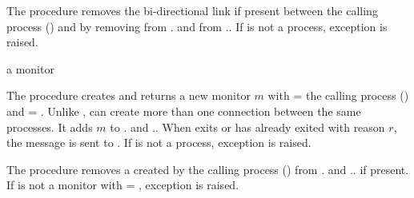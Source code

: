 \begin{procedure}
\end{procedure}
\returns{} 

The  procedure removes the bi-directional link if
present between the calling process () and  by
removing  from . and
 from ..  If  is not
a process, exception  is
raised.

\begin{procedure}
\end{procedure}
\returns{} a monitor

The  procedure creates and returns a new monitor $m$
with  = the calling process () and
 = .  Unlike ,
 can create more than one connection between the same
processes.  It adds $m$ to . and
..  When  exits or has
already exited with reason $r$, the message  is sent to .  If  is not
a process, exception  is
raised.

\begin{procedure}
\end{procedure}
\returns{} 

The  procedure removes a  created by
the calling process () from . and
.. if present.  If
 is not a monitor with  = ,
exception  is raised.

\begin{procedure}
\end{procedure}
\returns{} 

